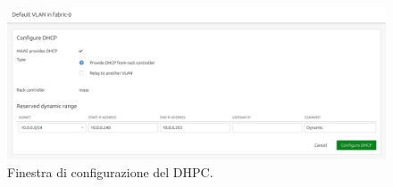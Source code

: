 % 
\begin{figure}[H]
    \centering
    \includegraphics[width=1\linewidth]{tesi/files/immagini/maas/DHCP 240-253}
    \caption{Finestra di configurazione del DHPC.}
    \label{fig:maas_config_dhcp}
\end{figure}

